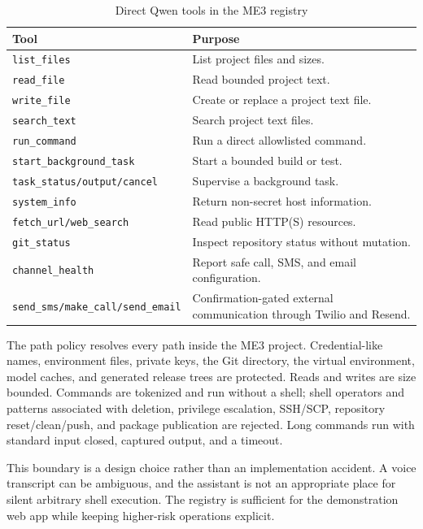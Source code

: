 \documentclass[sigconf,nonacm]{acmart}
\begin{document}
\begin{table}[t]
\caption{Direct Qwen tools in the ME3 registry}
\label{tab:tools}
\small
\begin{tabularx}{\columnwidth}{@{}lX@{}}
\toprule
Tool & Purpose \\
\midrule
\texttt{list\_files} & List project files and sizes. \\
\texttt{read\_file} & Read bounded project text. \\
\texttt{write\_file} & Create or replace a project text file. \\
\texttt{search\_text} & Search project text files. \\
\texttt{run\_command} & Run a direct allowlisted command. \\
\texttt{start\_background\_task} & Start a bounded build or test. \\
\texttt{task\_status/output/cancel} & Supervise a background task. \\
\texttt{system\_info} & Return non-secret host information. \\
\texttt{fetch\_url/web\_search} & Read public HTTP(S) resources. \\
\texttt{git\_status} & Inspect repository status without mutation. \\
\texttt{channel\_health} & Report safe call, SMS, and email configuration. \\
\texttt{send\_sms/make\_call/send\_email} & Confirmation-gated external
communication through Twilio and Resend. \\
\bottomrule
\end{tabularx}
\end{table}

The path policy resolves every path inside the ME3 project. Credential-like
names, environment files, private keys, the Git directory, the virtual
environment, model caches, and generated release trees are protected. Reads
and writes are size bounded. Commands are tokenized and run without a shell;
shell operators and patterns associated with deletion, privilege escalation,
SSH/SCP, repository reset/clean/push, and package publication are rejected.
Long commands run with standard input closed, captured output, and a timeout.

This boundary is a design choice rather than an implementation accident. A
voice transcript can be ambiguous, and the assistant is not an appropriate
place for silent arbitrary shell execution. The registry is sufficient for the
demonstration web app while keeping higher-risk operations explicit.
\end{document}
